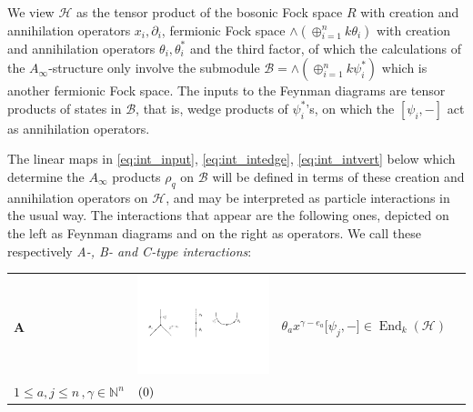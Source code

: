 \documentclass[english,letter paper,12pt,leqno]{article}
\newcommand{\tagarray}{\mbox{}\refstepcounter{equation}$(\theequation)$}
\theoremstyle{example}
\numberwithin{equation}{section}
\DeclareMathOperator{\End}{End}
\begin{document}
We view $\mathscr{H}$ as the tensor product of the bosonic Fock space $R$ with creation and annihilation operators $x_i, \partial_i$, fermionic Fock space $\wedge( \oplus_{i=1}^n k \theta_i )$ with creation and annihilation operators $\theta_i, \theta_i^*$ and the third factor, of which the calculations of the $A_\infty$-structure only involve the submodule $\mathscr{B} = \wedge( \oplus_{i=1}^n k \psi_i^* )$ which is another fermionic Fock space. The inputs to the Feynman diagrams are tensor products of states in $\mathscr{B}$, that is, wedge products of $\psi_i^*$'s, on which the $[\psi_i, -]$ act as annihilation operators.

The linear maps in \eqref{eq:int_input}, \eqref{eq:int_intedge}, \eqref{eq:int_intvert} below which determine the $A_\infty$ products $\rho_q$ on $\mathscr{B}$ will be defined in terms of these creation and annihilation operators on $\mathscr{H}$, and may be interpreted as particle interactions in the usual way. The interactions that appear are the following ones, depicted on the left as Feynman diagrams and on the right as operators. We call these respectively \emph{A-, B- and C-type interactions}:

\begin{center}
\begin{tabular}{ >{\centering}m{1cm} >{\centering}m{4cm} >{\centering}m{8cm} >{\centering}m{1cm}}
\textbf{A}
&
\includegraphics[scale=0.4]{dia2}
&
$\theta_a x^{\gamma - e_a} \big[\psi_j, -\big] \in \End_k( \mathscr{H} )$\\
\vspace{0.5cm}
$1 \le a,j \le n\,, \gamma \in \mathbb{N}^n$
&
\tagarray{\label{interaction_1}}
\end{tabular}
\end{center}
\end{document}
